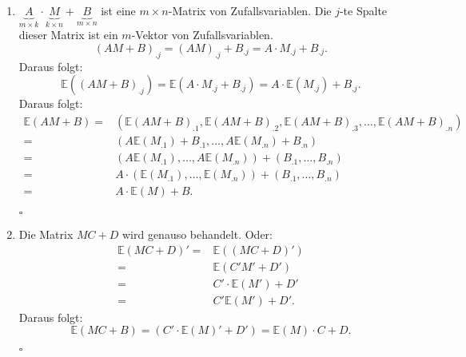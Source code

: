 \documentclass[10pt]{article}
\newcommand{\EW}{\mathbb{E}} %
\newenvironment{BWS}[1][]
{\begin{Beweis}[frametitle=#1]}{\end{Beweis}}
\begin{document}
\begin{BWS}[Beweis 3.0.1 (Linearität des Erwartungswertes)]
\begin{enumerate}
\begin{equation*}
						\right)
					\end{equation*}
					\item $\underbrace{A}_{m \times k} \cdot \underbrace{M}_{k\times n} + \underbrace{B}_{m \times n}$ ist eine $m \times n$-Matrix von Zufallsvariablen. Die $j$-te Spalte dieser Matrix ist ein $m$-Vektor von Zufallsvariablen. 
					\begin{equation*}
						(AM+ B)_{.j} = (AM)_{.j}+B_{.j} = A \cdot M_{.j} + B_{.j}. 
					\end{equation*}
					Daraus folgt:
					\begin{equation*}
						\EW((AM+B)_{.j}) = \EW (A \cdot M_{.j} + B_{.j}) = A \cdot \EW(M_{.j}) + B_{.j}.
					\end{equation*}
					Daraus folgt:
					\begin{equation*}
						\begin{split}
							\EW(AM+B) =& (\EW(AM+B)_{.1},\EW(AM+B)_{.2},\EW(AM+B)_{.3},\ldots,\EW(AM+B)_{.n})\\
							=& (A\EW(M_{.1})+B_{.1}, \ldots, A\EW(M_{.n})+B_{.n})\\
							=&(A\EW(M_{.1}), \ldots, A\EW(M_{.n})) + (B_{.1}, \ldots, B_{.n})\\
							=& A \cdot (\EW(M_{.1}), \ldots, \EW(M_{.n})) + (B_{.1}, \ldots, B_{.n})\\
							=& A \cdot \EW(M) + B.
						\end{split}
					\end{equation*}
					\begin{flushright}
						$\square$
					\end{flushright}
					\item Die Matrix $MC+D$ wird genauso behandelt. Oder:
					\begin{equation*}
						\begin{split}
							\EW(MC+D)' =& \EW((MC+D)')\\
							=& \EW(C'M'+D')\\
							=& C' \cdot \EW(M') + D'\\
							=& C' \EW(M')+D'.
						\end{split}
					\end{equation*}
					Daraus folgt:
					\begin{equation*}
						\EW(MC+B) = (C' \cdot \EW(M)' + D') = \EW(M) \cdot C + D.
					\end{equation*}
					\begin{flushright}
						$\square$
					\end{flushright}
				\end{enumerate}
			\end{BWS}
			
\end{document}
